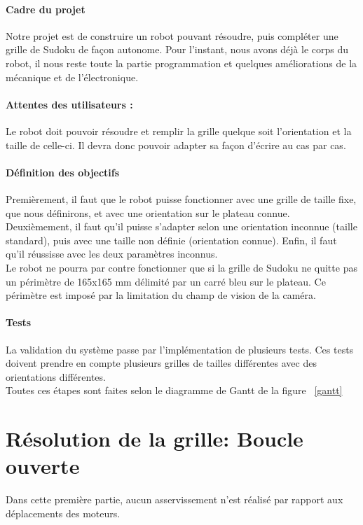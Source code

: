 \documentclass[12pt]{article}
\begin{document}
\subsection{Cadre du projet}
Notre projet est de construire un robot pouvant résoudre, puis compléter une grille de Sudoku de façon autonome. 
Pour l'instant, nous avons déjà le corps du robot, il nous reste toute la partie programmation et quelques améliorations de la mécanique et de l'électronique.

\subsection{Attentes des utilisateurs :}

Le robot doit pouvoir résoudre et remplir la grille quelque soit l'orientation et la taille de celle-ci. Il devra donc pouvoir adapter sa façon d'écrire au cas par cas.

\subsection{Définition des objectifs}

Premièrement, il faut que le robot puisse fonctionner avec une grille de taille fixe, que nous définirons, et avec une orientation sur le plateau connue.\\

\noindent
Deuxièmement, il faut qu'il puisse s'adapter selon une orientation inconnue (taille standard), puis avec une taille non définie (orientation connue). Enfin, il faut qu'il réussisse avec les deux paramètres inconnus.\\

\noindent
Le robot ne pourra par contre fonctionner que si la grille de Sudoku ne quitte pas un périmètre de 165x165 mm délimité par un carré bleu sur le plateau. Ce périmètre est imposé par la limitation du champ de vision de la caméra.

\subsection{Tests}
La validation du système passe par l'implémentation de plusieurs tests. Ces tests doivent prendre en compte plusieurs grilles de tailles différentes avec des orientations différentes.\\
Toutes ces étapes sont faites selon le diagramme de Gantt de la figure ~\ref{gantt}


\part{Résolution de la grille: Boucle ouverte}
Dans cette première partie, aucun asservissement n'est réalisé par rapport aux déplacements des moteurs.
\end{document}
